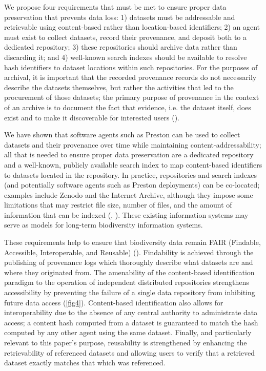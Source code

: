 \documentclass[10pt,letterpaper]{article}
\begin{document}
We propose four requirements that must be met to ensure proper data preservation that prevents data loss: 1) datasets must be addressable and retrievable using content-based rather than location-based identifiers; 2) an agent must exist to collect datasets, record their provenance, and deposit both to a dedicated repository; 3) these repositories should archive data rather than discarding it; and 4) well-known search indexes should be available to resolve hash identifiers to dataset locations within such repositories. For the purposes of archival, it is important that the recorded provenance records do not necessarily describe the datasets themselves, but rather the activities that led to the procurement of those datasets; the primary purpose of provenance in the context of an archive is to document the fact that evidence, i.e. the dataset itself, does exist and to make it discoverable for interested users (\cite{Bearman_1995}). 

We have shown that software agents such as Preston can be used to collect datasets and their provenance over time while maintaining content-addressability; all that is needed to ensure proper data preservation are a dedicated repository and a well-known, publicly available search index to map content-based identifiers to datasets located in the repository. In practice, repositories and search indexes (and potentially software agents such as Preston deployments) can be co-located; examples include Zenodo and the Internet Archive, although they impose some limitations that may restrict file size, number of files, and the amount of information that can be indexed (\cite{zenodo_2019}, \cite{archive_2019}). These existing information systems may serve as models for long-term biodiversity information systems. 

These requirements help to ensure that biodiversity data remain FAIR (Findable, Accessible, Interoperable, and Reusable) (\cite{Wilkinson_2016}). Findability is achieved through the publishing of provenance logs which thoroughly describe what datasets are and where they originated from. The amenability of the content-based identification paradigm to the operation of independent distributed repositories strengthens accessibility by preventing the failure of a single data repository from inhibiting future data access (\ref{fig4}). Content-based identification also allows for interoperability due to the absence of any central authority to administrate data access; a content hash computed from a dataset is guaranteed to match the hash computed by any other agent using the same dataset. Finally, and particularly relevant to this paper’s purpose, reusability is strengthened by enhancing the retrievability of referenced datasets and allowing users to verify that a retrieved dataset exactly matches that which was referenced. 
\end{document}
